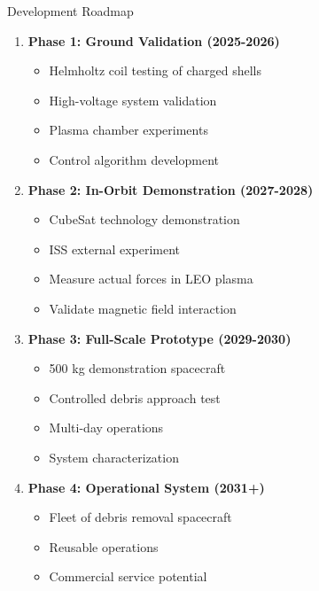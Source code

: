 \documentclass[aspectratio=169]{beamer}
\begin{document}
\begin{frame}{Development Roadmap}
\begin{enumerate}
    \item \textbf{Phase 1: Ground Validation (2025-2026)}
    \begin{itemize}
        \item Helmholtz coil testing of charged shells
        \item High-voltage system validation
        \item Plasma chamber experiments
        \item Control algorithm development
    \end{itemize}

    \item \textbf{Phase 2: In-Orbit Demonstration (2027-2028)}
    \begin{itemize}
        \item CubeSat technology demonstration
        \item ISS external experiment
        \item Measure actual forces in LEO plasma
        \item Validate magnetic field interaction
    \end{itemize}

    \item \textbf{Phase 3: Full-Scale Prototype (2029-2030)}
    \begin{itemize}
        \item 500 kg demonstration spacecraft
        \item Controlled debris approach test
        \item Multi-day operations
        \item System characterization
    \end{itemize}

    \item \textbf{Phase 4: Operational System (2031+)}
    \begin{itemize}
        \item Fleet of debris removal spacecraft
        \item Reusable operations
        \item Commercial service potential
    \end{itemize}
\end{enumerate}
\end{frame}
\end{document}
